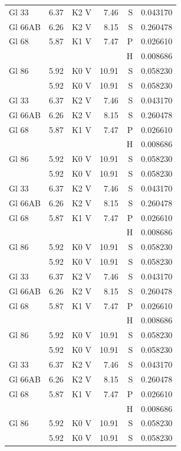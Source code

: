 \documentclass{aa}
\begin{document}
{\begin{longtable}{lllrrr}
Gl 33    & 6.37 & K2 V & 7.46 & S & 0.043170\\
Gl 66AB  & 6.26 & K2 V & 8.15 & S & 0.260478\\
Gl 68    & 5.87 & K1 V & 7.47 & P & 0.026610\\
         &      &      &      & H & 0.008686\\
Gl 86    & 5.92 & K0 V & 10.91& S & 0.058230\\            & 5.92 & K0 V & 10.91& S & 0.058230\\
Gl 33    & 6.37 & K2 V & 7.46 & S & 0.043170\\
Gl 66AB  & 6.26 & K2 V & 8.15 & S & 0.260478\\
Gl 68    & 5.87 & K1 V & 7.47 & P & 0.026610\\
         &      &      &      & H & 0.008686\\
Gl 86    & 5.92 & K0 V & 10.91& S & 0.058230\\            & 5.92 & K0 V & 10.91& S & 0.058230\\
Gl 33    & 6.37 & K2 V & 7.46 & S & 0.043170\\
Gl 66AB  & 6.26 & K2 V & 8.15 & S & 0.260478\\
Gl 68    & 5.87 & K1 V & 7.47 & P & 0.026610\\
         &      &      &      & H & 0.008686\\
Gl 86    & 5.92 & K0 V & 10.91& S & 0.058230\\            & 5.92 & K0 V & 10.91& S & 0.058230\\
Gl 33    & 6.37 & K2 V & 7.46 & S & 0.043170\\
Gl 66AB  & 6.26 & K2 V & 8.15 & S & 0.260478\\
Gl 68    & 5.87 & K1 V & 7.47 & P & 0.026610\\
         &      &      &      & H & 0.008686\\
Gl 86    & 5.92 & K0 V & 10.91& S & 0.058230\\            & 5.92 & K0 V & 10.91& S & 0.058230\\
Gl 33    & 6.37 & K2 V & 7.46 & S & 0.043170\\
Gl 66AB  & 6.26 & K2 V & 8.15 & S & 0.260478\\
Gl 68    & 5.87 & K1 V & 7.47 & P & 0.026610\\
         &      &      &      & H & 0.008686\\
Gl 86    & 5.92 & K0 V & 10.91& S & 0.058230\\            & 5.92 & K0 V & 10.91& S & 0.058230\\

\end{longtable}}
\end{document}
